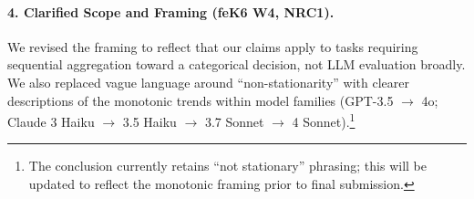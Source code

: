 \documentclass[11pt, letterpaper]{article}
\begin{document}
\paragraph{4. Clarified Scope and Framing (feK6 W4, NRC1).}
We revised the framing to reflect that our claims apply to tasks requiring sequential aggregation toward a categorical decision, not LLM evaluation broadly. We also replaced vague language around ``non-stationarity'' with clearer descriptions of the monotonic trends within model families (GPT-3.5 $\to$ 4o; Claude 3 Haiku $\to$ 3.5 Haiku $\to$ 3.7 Sonnet $\to$ 4 Sonnet).\footnote{The conclusion currently retains ``not stationary'' phrasing; this will be updated to reflect the monotonic framing prior to final submission.}
\end{document}
